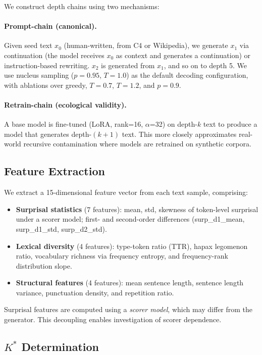 \documentclass[11pt,a4paper]{article}
\newcommand{\kstar}{K^{*}}
\begin{document}
We construct depth chains using two mechanisms:

\paragraph{Prompt-chain (canonical).}
Given seed text $x_0$ (human-written, from C4 or Wikipedia), we generate $x_1$ via continuation (the model receives $x_0$ as context and generates a continuation) or instruction-based rewriting.
$x_2$ is generated from $x_1$, and so on to depth 5.
We use nucleus sampling ($p = 0.95$, $T = 1.0$) as the default decoding configuration, with ablations over greedy, $T = 0.7$, $T = 1.2$, and $p = 0.9$.

\paragraph{Retrain-chain (ecological validity).}
A base model is fine-tuned (LoRA, rank=16, $\alpha$=32) on depth-$k$ text to produce a model that generates depth-$(k{+}1)$ text.
This more closely approximates real-world recursive contamination where models are retrained on synthetic corpora.

\subsection{Feature Extraction}
\label{sec:features}

We extract a 15-dimensional feature vector from each text sample, comprising:
\begin{itemize}
    \item \textbf{Surprisal statistics} (7 features): mean, std, skewness of token-level surprisal under a scorer model; first- and second-order differences (surp\_d1\_mean, surp\_d1\_std, surp\_d2\_std).
    \item \textbf{Lexical diversity} (4 features): type-token ratio (TTR), hapax legomenon ratio, vocabulary richness via frequency entropy, and frequency-rank distribution slope.
    \item \textbf{Structural features} (4 features): mean sentence length, sentence length variance, punctuation density, and repetition ratio.
\end{itemize}

Surprisal features are computed using a \emph{scorer model}, which may differ from the generator.
This decoupling enables investigation of scorer dependence.

\subsection{$\kstar$ Determination}
\label{sec:kstar_def}
\end{document}
